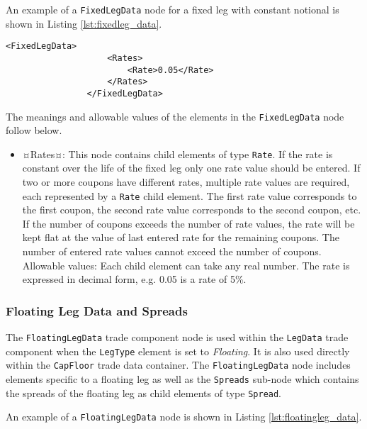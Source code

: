 An example of a \lstinline!FixedLegData! node for a fixed leg with constant notional is shown in Listing \ref{lst:fixedleg_data}.


\begin{lstlisting}[caption=FixedLegData, label=lst:fixedleg_data]
              <FixedLegData>
                    <Rates>
                        <Rate>0.05</Rate>
                    </Rates>
                </FixedLegData>
\end{lstlisting}

The meanings and allowable values of the elements in the \lstinline!FixedLegData! node follow below.

\begin{itemize}

\item ¤Rates¤: This node contains child elements of type \lstinline!Rate!. If the rate is constant over the life of the fixed leg only one rate value should be entered. If two or more coupons have different rates, multiple rate values are required, each represented by a \lstinline!Rate! child element. The first rate value corresponds to the first coupon, the second rate value corresponds to the second coupon, etc. If the number of coupons exceeds the number of rate values, the rate will be kept flat at the value of last entered rate for the remaining coupons.  The number of entered rate values cannot exceed the number of coupons. \\Allowable values: Each child element can take any  real number. The rate is expressed in decimal form, e.g. 0.05 is a rate of 5\%.
\end{itemize}




\subsubsection{Floating Leg Data and Spreads}
\label{ss:floatingleg_data}

The \lstinline!FloatingLegData! trade component node is used within the \lstinline!LegData! trade component when the \lstinline!LegType! element is set to \emph{Floating}. It is also used directly within the \lstinline!CapFloor! trade data container. 
The \lstinline!FloatingLegData! node includes elements specific to a floating leg as well as the \lstinline!Spreads! sub-node which contains the spreads of the floating leg as child elements of type \lstinline!Spread!.

An example of a \lstinline!FloatingLegData! node is shown in Listing \ref{lst:floatingleg_data}.

